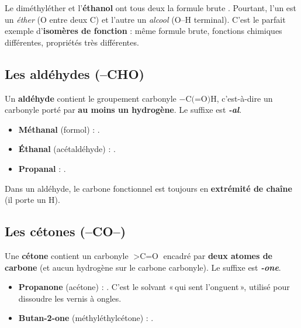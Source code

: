 \documentclass[11pt,a4paper]{article}
\begin{document}
\begin{attention}
Le diméthyléther  et l'\textbf{éthanol}  ont tous deux la formule brute . Pourtant, l'un est un \emph{éther} (O entre deux C) et l'autre un \emph{alcool} (O--H terminal). C'est le parfait exemple d'\textbf{isomères de fonction} : même formule brute, fonctions chimiques différentes, propriétés très différentes.
\end{attention}

\subsection{Les aldéhydes (--CHO)}
\begin{definition}[Aldéhyde]
Un \textbf{aldéhyde} contient le groupement carbonyle $-\text{C(=O)H}$, c'est-à-dire un carbonyle porté par \textbf{au moins un hydrogène}. Le suffixe est \textbf{\textit{-al}}.
\end{definition}

\begin{exemple}[Aldéhydes]
\begin{itemize}[leftmargin=1.6em,itemsep=2pt]
  \item \textbf{Méthanal} (formol)  : .
  \item \textbf{Éthanal} (acétaldéhyde)  : .
  \item \textbf{Propanal}  : .
\end{itemize}
Dans un aldéhyde, le carbone fonctionnel est toujours en \textbf{extrémité de chaîne} (il porte un H).
\end{exemple}

\subsection{Les cétones (--CO--)}
\begin{definition}[Cétone]
Une \textbf{cétone} contient un carbonyle $>\text{C=O}$ encadré par \textbf{deux atomes de carbone} (et aucun hydrogène sur le carbone carbonyle). Le suffixe est \textbf{\textit{-one}}.
\end{definition}

\begin{exemple}[Cétones]
\begin{itemize}[leftmargin=1.6em,itemsep=2pt]
  \item \textbf{Propanone} (acétone)  : . C'est le solvant «\,qui sent l'onguent\,», utilisé pour dissoudre les vernis à ongles.
  \item \textbf{Butan-2-one} (méthyléthylcétone)  : .
\end{itemize}
\end{exemple}
\end{document}
